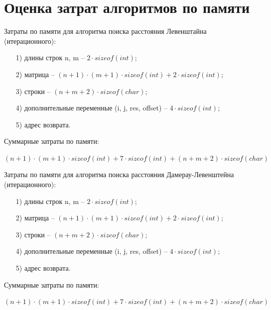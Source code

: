 \documentclass[12pt]{report}
\begin{document}
	\section{Оценка затрат алгоритмов по памяти}
	
	Затраты по памяти для алгоритма поиска расстояния Левенштайна (итерационного):

	\begin{enumerate}
	\item[1)] длины строк n, m -- $2 \cdot sizeof(int)$;
	\item[2)] матрица -- $(n + 1) \cdot (m + 1) \cdot sizeof(int) + 2 \cdot sizeof(int)$;
	\item[3)] строки -- $(n + m + 2) \cdot sizeof(char)$;
	\item[4)] дополнительные переменные (i, j, res, offset) -- $4 \cdot sizeof(int)$; 
	\item[5)] адрес возврата.
	\end{enumerate}
	
	Суммарные затраты по памяти:
	
	$(n + 1) \cdot (m + 1) \cdot sizeof(int) + 7 \cdot sizeof(int) + (n + m + 2) \cdot sizeof(char)$\newline\newline\newline\newline\newline\newline\newline
	
	Затраты по памяти для алгоритма поиска расстояния Дамерау-Левенштейна (итерационного):
	
	\begin{enumerate}
	\item[1)] длины строк n, m -- $2 \cdot sizeof(int)$;
	\item[2)] матрица -- $(n + 1) \cdot (m + 1) \cdot sizeof(int) + 2 \cdot sizeof(int)$;
	\item[3)] строки -- $(n + m + 2) \cdot sizeof(char)$;
	\item[4)] дополнительные переменные (i, j, res, offset) -- $4 \cdot sizeof(int)$; 
	\item[5)] адрес возврата.
	\end{enumerate}
	
	Суммарные затраты по памяти:
	
	$(n + 1) \cdot (m + 1) \cdot sizeof(int) + 7 \cdot sizeof(int) + (n + m + 2) \cdot sizeof(char)$\newline
	
\end{document}
